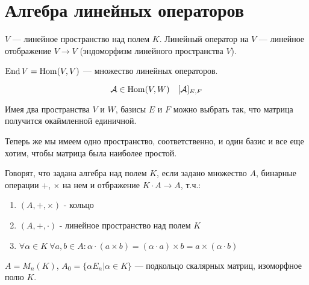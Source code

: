 \documentclass[main]{subfiles}
\begin{document}
\chapter{Алгебра линейных операторов} 
\begin{definition} [Алгебра]
$V$ — линейное пространство над полем $K$. 
Линейный оператор на $V$ — линейное отображение $V \to V$ (эндоморфизм линейного пространства $V$).
\end{definition} 
\begin{definition} 
$\operatorname{End} V = \operatorname{Hom}(V, V)$ —  множество линейных операторов.
\end{definition}

\[\mathcal{A} \in \operatorname{Hom} (V, W) \quad [\mathcal{A}]_{E,F}\]

Имея два пространства $V$ и $W$, базисы $E$ и $F$ можно выбрать так, что матрица получится окаймленной единичной.

Теперь же мы имеем одно пространство, соответственно, и один базис и все еще хотим, чтобы матрица была наиболее простой. 

\begin{definition}
    Говорят, что задана алгебра над полем $K$, если задано множество $A$, бинарные операции +, $\times$ на нем и отбражение $K \cdot A \to A$, т.ч.:
    \begin{enumerate}
        \item $(A,+, \times)$ - кольцо 
        \item $(A,+, \cdot)$ - линейное пространство над полем $K$
        \item $\forall \alpha \in K \  \forall a, b \in A : \alpha \cdot (a \times b) = (\alpha \cdot a) \times b = a \times (\alpha \cdot b)$
    \end{enumerate}
\end{definition}

\begin{example}
    $A = M_n(K)$, 
    $A_0 = \{ \alpha E_n | \alpha \in K\}$ —  подкольцо скалярных матриц, изоморфное полю $K$.
\end{example}
\end{document}
